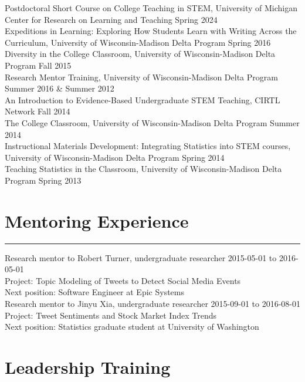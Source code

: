 \documentclass[
  10pt,
]
{article}
\begin{document}
\normalsize Postdoctoral Short Course on College Teaching in STEM,
University of Michigan Center for Research on Learning and Teaching
\hfill Spring 2024\\
\normalsize Expeditions in Learning: Exploring How Students Learn with
Writing Across the Curriculum, University of Wisconsin-Madison Delta
Program \hfill Spring 2016\\
\normalsize Diversity in the College Classroom, University of
Wisconsin-Madison Delta Program \hfill Fall 2015\\
\normalsize Research Mentor Training, University of Wisconsin-Madison
Delta Program \hfill Summer 2016 \& Summer 2012\\
\normalsize An Introduction to Evidence-Based Undergraduate STEM
Teaching, CIRTL Network \hfill Fall 2014\\
\normalsize The College Classroom, University of Wisconsin-Madison Delta
Program \hfill Summer 2014\\
\normalsize Instructional Materials Development: Integrating Statistics
into STEM courses, University of Wisconsin-Madison Delta Program
\hfill Spring 2014\\
\normalsize Teaching Statistics in the Classroom, University of
Wisconsin-Madison Delta Program \hfill Spring 2013

\section{Mentoring Experience}\label{mentoring-experience}

\hrule

\normalsize Research mentor to Robert Turner, undergraduate researcher
\hfill 2015-05-01 to 2016-05-01\\
Project: Topic Modeling of Tweets to Detect Social Media Events\\
Next position: Software Engineer at Epic Systems\\
\normalsize Research mentor to Jinyu Xia, undergraduate researcher
\hfill 2015-09-01 to 2016-08-01\\
Project: Tweet Sentiments and Stock Market Index Trends\\
Next position: Statistics graduate student at University of Washington

\section{Leadership Training}\label{leadership-training}
\end{document}
